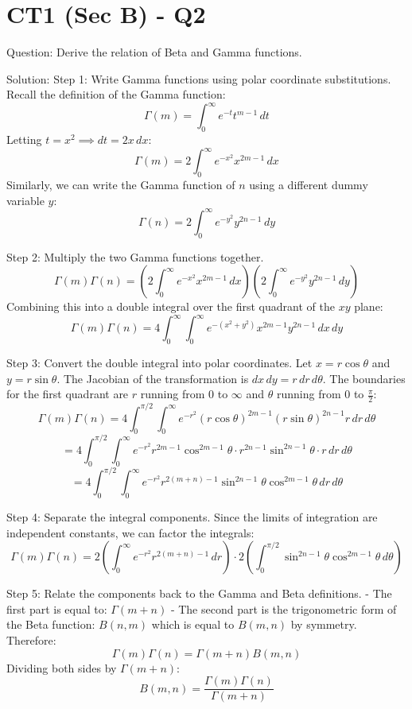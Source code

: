 \documentclass{article}
\begin{document}
\section*{CT1 (Sec B) - Q2}
Question:
Derive the relation of Beta and Gamma functions.

Solution:
Step 1: Write Gamma functions using polar coordinate substitutions.
Recall the definition of the Gamma function:
\[
\Gamma(m) = \int_0^\infty e^{-t} t^{m-1} \, dt
\]
Letting $t = x^2 \implies dt = 2x \, dx$:
\[
\Gamma(m) = 2 \int_0^\infty e^{-x^2} x^{2m-1} \, dx
\]
Similarly, we can write the Gamma function of $n$ using a different dummy variable $y$:
\[
\Gamma(n) = 2 \int_0^\infty e^{-y^2} y^{2n-1} \, dy
\]

Step 2: Multiply the two Gamma functions together.
\[
\Gamma(m)\Gamma(n) = \left( 2 \int_0^\infty e^{-x^2} x^{2m-1} \, dx \right) \left( 2 \int_0^\infty e^{-y^2} y^{2n-1} \, dy \right)
\]
Combining this into a double integral over the first quadrant of the $xy$ plane:
\[
\Gamma(m)\Gamma(n) = 4 \int_0^\infty \int_0^\infty e^{-(x^2+y^2)} x^{2m-1} y^{2n-1} \, dx \, dy
\]

Step 3: Convert the double integral into polar coordinates.
Let $x = r\cos\theta$ and $y = r\sin\theta$. The Jacobian of the transformation is $dx \, dy = r \, dr \, d\theta$.
The boundaries for the first quadrant are $r$ running from $0$ to $\infty$ and $\theta$ running from $0$ to $\frac{\pi}{2}$:
\[
\Gamma(m)\Gamma(n) = 4 \int_0^{\pi/2} \int_0^\infty e^{-r^2} (r\cos\theta)^{2m-1} (r\sin\theta)^{2n-1} r \, dr \, d\theta
\]
\[
= 4 \int_0^{\pi/2} \int_0^\infty e^{-r^2} r^{2m-1} \cos^{2m-1}\theta \cdot r^{2n-1} \sin^{2n-1}\theta \cdot r \, dr \, d\theta
\]
\[
= 4 \int_0^{\pi/2} \int_0^\infty e^{-r^2} r^{2(m+n)-1} \sin^{2n-1}\theta \cos^{2m-1}\theta \, dr \, d\theta
\]

Step 4: Separate the integral components.
Since the limits of integration are independent constants, we can factor the integrals:
\[
\Gamma(m)\Gamma(n) = 2 \left( \int_0^\infty e^{-r^2} r^{2(m+n)-1} \, dr \right) \cdot 2 \left( \int_0^{\pi/2} \sin^{2n-1}\theta \cos^{2m-1}\theta \, d\theta \right)
\]

Step 5: Relate the components back to the Gamma and Beta definitions.
- The first part is equal to: $\Gamma(m+n)$
- The second part is the trigonometric form of the Beta function: $B(n, m)$ which is equal to $B(m, n)$ by symmetry.
Therefore:
\[
\Gamma(m)\Gamma(n) = \Gamma(m+n) B(m, n)
\]
Dividing both sides by $\Gamma(m+n)$:
\[
B(m, n) = \frac{\Gamma(m)\Gamma(n)}{\Gamma(m+n)}
\]
\end{document}
